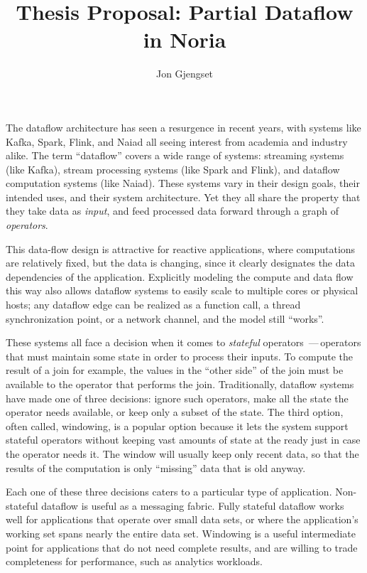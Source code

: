 \documentclass[12pt,letterpaper,twoside]{article}
\title{Thesis Proposal: Partial Dataflow in Noria}
\author{Jon Gjengset}
\begin{document}
\maketitle

The dataflow architecture has seen a resurgence in recent years, with systems
like Kafka\cite{kafka}, Spark\cite{spark,spark-streaming}, Flink\cite{flink}, and
Naiad\cite{naiad} all seeing interest from academia and industry alike. The term
``dataflow'' covers a wide range of systems: streaming systems (like Kafka),
stream processing systems (like Spark and Flink), and dataflow computation
systems (like Naiad). These systems vary in their design goals, their intended
uses, and their system architecture. Yet they all share the property that they
take data as \emph{input}, and feed processed data forward through a graph of
\emph{operators}.

This data-flow design is attractive for reactive applications, where
computations are relatively fixed, but the data is changing, since it clearly
designates the data dependencies of the application. Explicitly modeling the
compute and data flow this way also allows dataflow systems to easily scale to
multiple cores or physical hosts; any dataflow edge can be realized as a
function call, a thread synchronization point, or a network channel, and the
model still ``works''.

These systems all face a decision when it comes to \emph{stateful} operators\,
---\,operators that must maintain some state in order to process their inputs.
To compute the result of a join for example, the values in the ``other side'' of
the join must be available to the operator that performs the join.
Traditionally, dataflow systems have made one of three decisions: ignore such
operators, make all the state the operator needs available, or keep only a
subset of the state. The third option, often called, windowing, is a popular
option because it lets the system support stateful operators without keeping
vast amounts of state at the ready just in case the operator needs it. The
window will usually keep only recent data, so that the results of the
computation is only ``missing'' data that is old anyway.

Each one of these three decisions caters to a particular type of application.
Non-stateful dataflow is useful as a messaging fabric. Fully stateful dataflow
works well for applications that operate over small data sets, or where the
application's working set spans nearly the entire data set. Windowing is a
useful intermediate point for applications that do not need complete results,
and are willing to trade completeness for performance, such as analytics
workloads.
\end{document}
